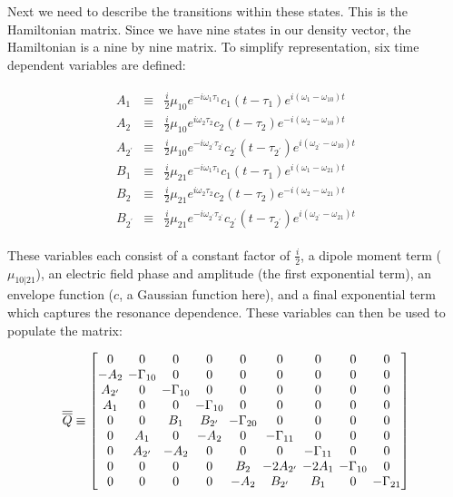 Next we need to describe the transitions within these states. This is
the Hamiltonian matrix. Since we have nine states in our density vector,
the Hamiltonian is a nine by nine matrix. To simplify representation,
six time dependent variables are defined:

\[\begin{aligned}
\begin{aligned}
A_1 &\equiv& \frac{i}{2}\mu_{10}e^{-i\omega_1\tau_1}c_1(t-\tau_1)e^{i(\omega_1-\omega_{10})t} \\
A_2 &\equiv& \frac{i}{2}\mu_{10}e^{i\omega_2\tau_2}c_2(t-\tau_2)e^{-i(\omega_2-\omega_{10})t} \\
A_{2^\prime} &\equiv& \frac{i}{2}\mu_{10}e^{-i\omega_{2^\prime}\tau_{2^\prime}}c_{2^\prime}(t-\tau_{2^\prime})e^{i(\omega_{2^\prime}-\omega_{10})t} \\
B_1 &\equiv& \frac{i}{2}\mu_{21}e^{-i\omega_1\tau_1}c_1(t-\tau_1)e^{i(\omega_1-\omega_{21})t} \\
B_2 &\equiv& \frac{i}{2}\mu_{21}e^{i\omega_2\tau_2}c_2(t-\tau_2)e^{-i(\omega_2-\omega_{21})t} \\
B_{2^\prime} &\equiv& \frac{i}{2}\mu_{21}e^{-i\omega_{2^\prime}\tau_{2^\prime}}c_{2^\prime}(t-\tau_{2^\prime})e^{i(\omega_{2^\prime}-\omega_{21})t}\end{aligned}
\end{aligned}\]

These variables each consist of a constant factor of \(\frac{i}{2}\), a
dipole moment term (\(\mu_{10|21}\)), an electric field phase and
amplitude (the first exponential term), an envelope function (\(c\), a
Gaussian function here), and a final exponential term which captures the
resonance dependence. These variables can then be used to populate the
matrix:

\[\begin{aligned}
\overline{\overline{Q}} \equiv
\setlength{\arraycolsep}{2pt}
\begin{bmatrix}
    0 & 0 & 0 & 0 & 0 & 0 & 0 & 0 & 0 \\
    -A_2 & -\Gamma_{10} & 0 & 0 & 0 & 0 & 0 & 0 & 0 \\
    A_{2^\prime} & 0 & -\Gamma_{10} & 0 & 0 & 0 & 0 & 0 & 0 \\
    A_1 & 0 & 0 & -\Gamma_{10} & 0 & 0 & 0 & 0 & 0 \\
    0 & 0 & B_1 & B_{2^\prime} & -\Gamma_{20} & 0 & 0 & 0 & 0 \\
    0 & A_1 & 0 & -A_2 & 0 & -\Gamma_{11} & 0 & 0 & 0 \\
    0 & A_{2^\prime} & -A_2 & 0 & 0 & 0 & -\Gamma_{11} & 0 & 0 \\
    0 & 0 & 0 & 0 & B_2 & -2A_{2^\prime} & -2A_1 & -\Gamma_{10} & 0 \\
    0 & 0 & 0 & 0 & -A_2 & B_{2^\prime} & B_1 & 0 & -\Gamma_{21}
\end{bmatrix}
\label{eq:single_Q}
\end{aligned}\]

